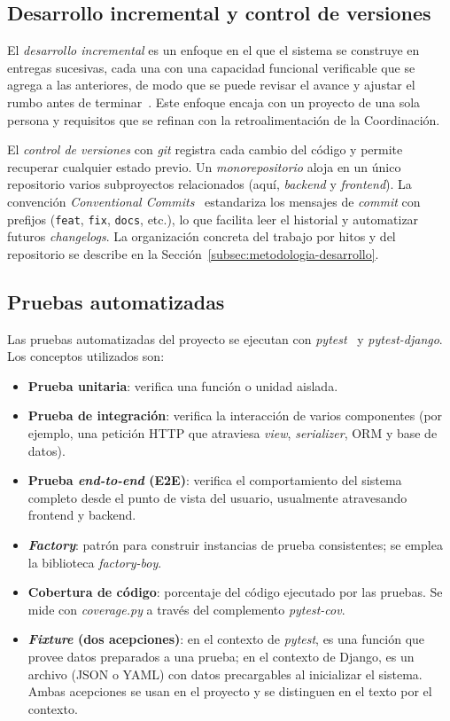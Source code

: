 \subsection{Desarrollo incremental y control de versiones}\label{subsec:metodologia}

El \emph{desarrollo incremental} es un enfoque en el que el sistema se construye en entregas sucesivas, cada una con una capacidad funcional verificable que se agrega a las anteriores, de modo que se puede revisar el avance y ajustar el rumbo antes de terminar~\cite{sommerville2011}. Este enfoque encaja con un proyecto de una sola persona y requisitos que se refinan con la retroalimentación de la Coordinación.

El \emph{control de versiones} con \emph{git} registra cada cambio del código y permite recuperar cualquier estado previo. Un \emph{monorepositorio} aloja en un único repositorio varios subproyectos relacionados (aquí, \emph{backend} y \emph{frontend}). La convención \emph{Conventional Commits}~\cite{convcommits2020} estandariza los mensajes de \emph{commit} con prefijos (\texttt{feat}, \texttt{fix}, \texttt{docs}, etc.), lo que facilita leer el historial y automatizar futuros \emph{changelogs}. La organización concreta del trabajo por hitos y del repositorio se describe en la Sección~\ref{subsec:metodologia-desarrollo}.

\subsection{Pruebas automatizadas}\label{subsec:pruebas}

Las pruebas automatizadas del proyecto se ejecutan con \emph{pytest}~\cite{pytest2024} y \emph{pytest-django}. Los conceptos utilizados son:

\begin{itemize}
    \item \textbf{Prueba unitaria}: verifica una función o unidad aislada.
    \item \textbf{Prueba de integración}: verifica la interacción de varios componentes (por ejemplo, una petición HTTP que atraviesa \emph{view}, \emph{serializer}, ORM y base de datos).
    \item \textbf{Prueba \emph{end-to-end} (E2E)}: verifica el comportamiento del sistema completo desde el punto de vista del usuario, usualmente atravesando frontend y backend.
    \item \textbf{\emph{Factory}}: patrón para construir instancias de prueba consistentes; se emplea la biblioteca \emph{factory-boy}.
    \item \textbf{Cobertura de código}: porcentaje del código ejecutado por las pruebas. Se mide con \emph{coverage.py} a través del complemento \emph{pytest-cov}.
    \item \textbf{\emph{Fixture} (dos acepciones)}: en el contexto de \emph{pytest}, es una función que provee datos preparados a una prueba; en el contexto de Django, es un archivo (JSON o YAML) con datos precargables al inicializar el sistema. Ambas acepciones se usan en el proyecto y se distinguen en el texto por el contexto.
\end{itemize}